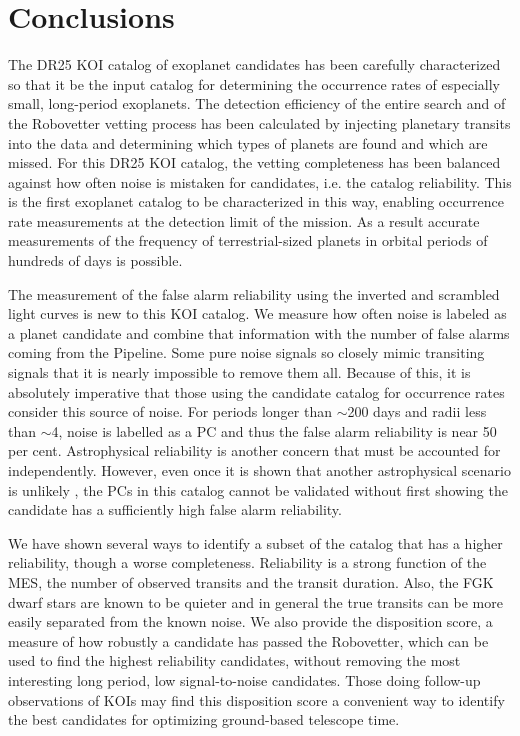 

\section{Conclusions}

The DR25 KOI catalog of exoplanet candidates has been carefully characterized so that it be the input catalog for determining the occurrence rates of especially small, long-period exoplanets. The detection efficiency of the entire search \citep{Burke2017b,Christiansen2017} and of the Robovetter vetting process has been calculated by injecting planetary transits into the data and determining which types of planets are found and which are missed. For this DR25 KOI catalog, the vetting completeness has been balanced against how often noise is mistaken for candidates, i.e. the catalog reliability. This is the first exoplanet catalog to be characterized in this way, enabling occurrence rate measurements at the detection limit of the mission.  As a result accurate measurements of the frequency of terrestrial-sized planets in orbital periods of hundreds of days is possible.

The measurement of the false alarm reliability using the inverted and scrambled light curves is new to this KOI catalog. We measure how often noise is labeled as a planet candidate and combine that information with the number of false alarms coming from the \Kepler{} Pipeline. Some pure noise signals so closely mimic transiting signals that it is nearly impossible to remove them all. Because of this, it is absolutely imperative that those using the candidate catalog for occurrence rates consider this source of noise. For periods longer than $\sim$200 days and radii less than $\sim$4\Rearth, noise is labelled as a PC and thus the false alarm reliability is near 50 per cent.  Astrophysical reliability is another concern that must be accounted for independently.  However, even once it is shown that another astrophysical scenario is unlikely \citep[as was done for the DR24 KOIs in ][]{Morton2017}, the PCs in this catalog cannot be validated without first showing the candidate has a sufficiently high false alarm reliability. 

We have shown several ways to identify a subset of the catalog that has a higher reliability, though a worse completeness. Reliability is a strong function of the MES, the number of observed transits and the transit duration. Also, the FGK dwarf stars are known to be quieter and in general the true transits can be more easily separated from the known noise. We also provide the disposition score, a measure of how robustly a candidate has passed the Robovetter, which can be used to find the highest reliability candidates, without removing the most interesting long period, low signal-to-noise candidates. Those doing follow-up observations of KOIs may find this disposition score a convenient way to identify the best candidates for optimizing ground-based telescope time.

